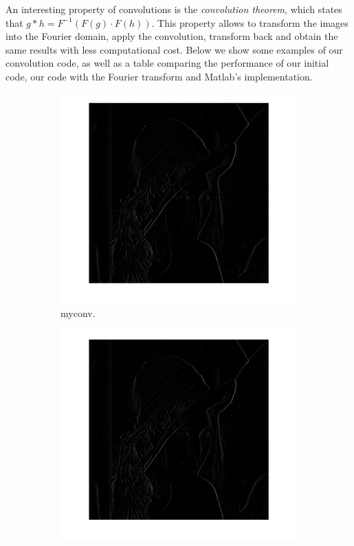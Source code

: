 \documentclass[12pt]{article}
\begin{document}
An interesting property of convolutions is the \emph{convolution theorem}, which states that $g * h = F^{-1} ( F(g) \cdot F(h) ) $.
This property allows to transform the images into the Fourier domain, apply the convolution, transform back and obtain the same results with less computational cost.
Below we show some examples of our convolution code, as well as a table comparing the performance of our initial code, our code with the Fourier transform and Matlab's implementation.

\begin{figure}[htbp]
        \centering
        \begin{subfigure}[b]{0.32\textwidth}
                \includegraphics[width=\textwidth]{images/conv1}
                \caption{myconv.}
                \label{fig:myconv}
        \end{subfigure}
        \begin{subfigure}[b]{0.32\textwidth}
                \includegraphics[width=\textwidth]{images/conv2}

\end{subfigure}
\end{figure}
\end{document}
